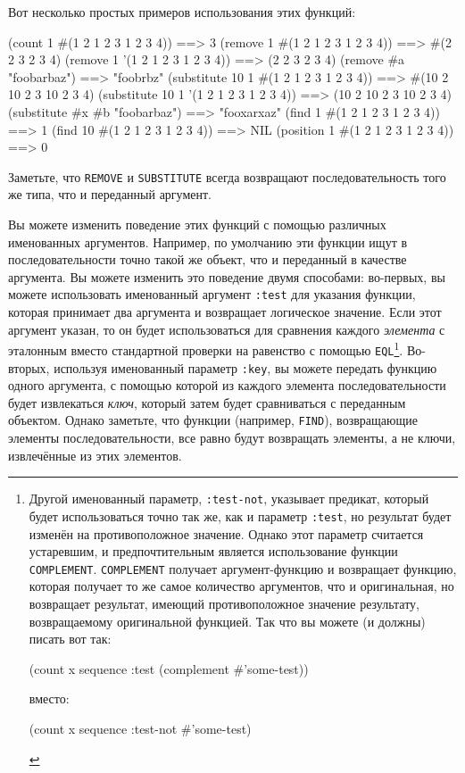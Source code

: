 Вот несколько простых примеров использования этих функций:

\begin{myverb}
(count 1 #(1 2 1 2 3 1 2 3 4))         ==> 3
(remove 1 #(1 2 1 2 3 1 2 3 4))        ==> #(2 2 3 2 3 4)
(remove 1 '(1 2 1 2 3 1 2 3 4))        ==> (2 2 3 2 3 4)
(remove #\bslash{}a "foobarbaz")               ==> "foobrbz"
(substitute 10 1 #(1 2 1 2 3 1 2 3 4)) ==> #(10 2 10 2 3 10 2 3 4)
(substitute 10 1 '(1 2 1 2 3 1 2 3 4)) ==> (10 2 10 2 3 10 2 3 4)
(substitute #\bslash{}x #\bslash{}b "foobarbaz")       ==> "fooxarxaz"
(find 1 #(1 2 1 2 3 1 2 3 4))          ==> 1
(find 10 #(1 2 1 2 3 1 2 3 4))         ==> NIL
(position 1 #(1 2 1 2 3 1 2 3 4))      ==> 0
\end{myverb}

Заметьте, что \lstinline{REMOVE} и \lstinline{SUBSTITUTE} всегда возвращают последовательность
того же типа, что и переданный аргумент.

Вы можете изменить поведение этих функций с помощью различных именованных аргументов.
Например, по умолчанию эти функции ищут в последовательности точно такой же объект, что и
переданный в качестве аргумента.  Вы можете изменить это поведение двумя способами: во-первых,
вы можете использовать именованный аргумент \lstinline{:test} для указания функции,
которая принимает два аргумента и возвращает логическое значение.  Если этот аргумент
указан, то он будет использоваться для сравнения каждого \textit{элемента} с эталонным вместо стандартной
проверки на равенство с помощью \lstinline{EQL}\footnote{Другой именованный параметр,
  \lstinline{:test-not}, указывает предикат, который будет использоваться точно так же, как и
  параметр \lstinline{:test}, но результат будет изменён на
  противоположное значение.  Однако этот параметр считается устаревшим, и предпочтительным
  является использование функции \lstinline{COMPLEMENT}.  \lstinline{COMPLEMENT} получает
  аргумент-функцию и возвращает функцию, которая получает то же самое количество
  аргументов, что и оригинальная, но возвращает результат, имеющий противоположное
  значение результату, возвращаемому оригинальной функцией.  Так что вы можете (и должны)
  писать вот так:

\begin{myverb}
(count x sequence :test (complement #'some-test))
\end{myverb}

\noindent{}вместо:

\begin{myverb}
(count x sequence :test-not #'some-test)
\end{myverb}

}\hspace{\footnotenegspace}. Во-вторых, используя именованный параметр \lstinline{:key}, вы можете передать функцию одного
аргумента, с помощью которой из каждого элемента последовательности будет извлекаться \textit{ключ},
который затем будет сравниваться с переданным объектом.  Однако заметьте, что
функции (например, \lstinline{FIND}), возвращающие элементы последовательности, все равно будут
возвращать элементы, а не ключи, извлечённые из этих элементов.

